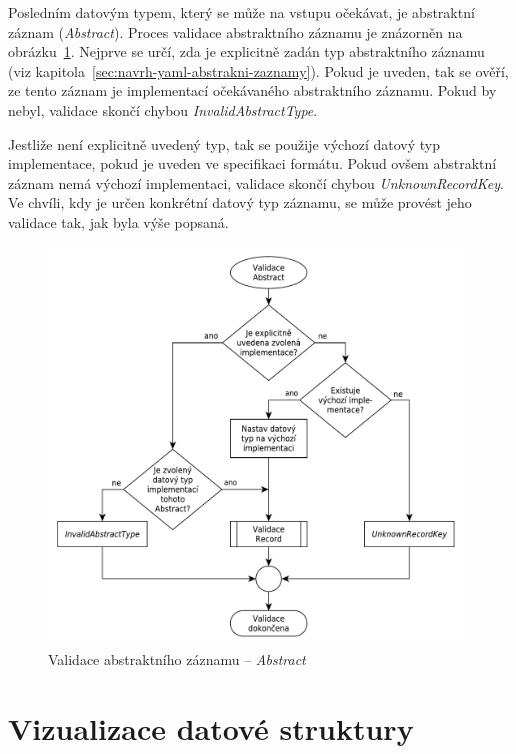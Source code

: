 \documentclass[FM,bw,DP]{tulthesis}
\begin{document}
Posledním datovým typem, který se může na vstupu očekávat, je abstraktní záznam (\textit{Abstract}). Proces validace abstraktního záznamu je znázorněn na obrázku~\ref{img:validation_abstract}. Nejprve se určí, zda je explicitně zadán typ abstraktního záznamu (viz kapitola~\ref{sec:navrh-yaml-abstrakni-zaznamy}). Pokud je uveden, tak se ověří, ze tento záznam je implementací očekávaného abstraktního záznamu. Pokud by nebyl, validace skončí chybou \textit{InvalidAbstractType}.

Jestliže není explicitně uvedený typ, tak se použije výchozí datový typ implementace, pokud je uveden ve specifikaci formátu. Pokud ovšem abstraktní záznam nemá výchozí implementaci, validace skončí chybou \textit{UnknownRecordKey}. Ve chvíli, kdy je určen konkrétní datový typ záznamu, se může provést jeho validace tak, jak byla výše popsaná.

\begin{figure}[H]
	\centering
    \includegraphics[width=0.98\textwidth]{../img/validation_abstract.pdf}
    \caption{Validace abstraktního záznamu -- \textit{Abstract}}
	\label{img:validation_abstract}
\end{figure}

\section{Vizualizace datové struktury}
\end{document}
